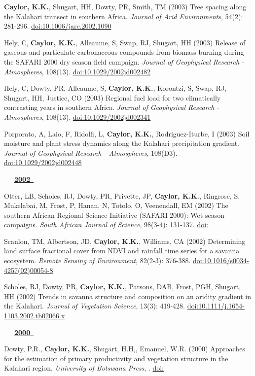 \begin{etaremune}
\item \textbf{ Caylor, K.K.}, Shugart, HH, Dowty, PR, Smith, TM (2003) Tree spacing along the Kalahari transect in southern Africa. \emph{Journal of Arid Environments}, 54(2): 281-296. \href{https://doi.org/10.1006/jare.2002.1090}{doi:10.1006/jare.2002.1090}
\item Hely, C, \textbf{ Caylor, K.K.}, Alleaume, S, Swap, RJ, Shugart, HH (2003) Release of gaseous and particulate carbonaceous compounds from biomass burning during the SAFARI 2000 dry season field campaign. \emph{Journal of Geophysical Research - Atmospheres}, 108(13). \href{https://doi.org/10.1029/2002jd002482}{doi:10.1029/2002jd002482}
\item Hely, C, Dowty, PR, Alleaume, S, \textbf{ Caylor, K.K.}, Korontzi, S, Swap, RJ, Shugart, HH, Justice, CO (2003) Regional fuel load for two climatically contrasting years in southern Africa. \emph{Journal of Geophysical Research - Atmospheres}, 108(13). \href{https://doi.org/10.1029/2002jd002341}{doi:10.1029/2002jd002341}
\item Porporato, A, Laio, F, Ridolfi, L, \textbf{ Caylor, K.K.}, Rodriguez-Iturbe, I (2003) Soil moisture and plant stress dynamics along the Kalahari precipitation gradient. \emph{Journal of Geophysical Research - Atmospheres}, 108(D3). \href{https://doi.org/10.1029/2002jd002448}{doi:10.1029/2002jd002448}

\vspace{0.1in}
\mbox{\ \ \ \underline{\textbf{2002 }}}
\vspace{0.1in}

\item Otter, LB, Scholes, RJ, Dowty, PR, Privette, JP, \textbf{ Caylor, K.K.}, Ringrose, S, Mukelabai, M, Frost, P, Hanan, N, Totolo, O, Veenendall, EM (2002) The southern African Regional Science Initiative (SAFARI 2000): Wet season campaigns. \emph{South African Journal of Science}, 98(3-4): 131-137. \href{https://doi.org/}{doi:}
\item Scanlon, TM, Albertson, JD, \textbf{ Caylor, K.K.}, Williams, CA (2002) Determining land surface fractional cover from NDVI and rainfall time series for a savanna ecosystem. \emph{Remote Sensing of Environment}, 82(2-3): 376-388. \href{https://doi.org/10.1016/s0034-4257(02)00054-8}{doi:10.1016/s0034-4257(02)00054-8}
\item Scholes, RJ, Dowty, PR, \textbf{ Caylor, K.K.}, Parsons, DAB, Frost, PGH, Shugart, HH (2002) Trends in savanna structure and composition on an aridity gradient in the Kalahari. \emph{Journal of Vegetation Science}, 13(3): 419-428. \href{https://doi.org/10.1111/j.1654-1103.2002.tb02066.x}{doi:10.1111/j.1654-1103.2002.tb02066.x}

\vspace{0.1in}
\mbox{\ \ \ \underline{\textbf{2000 }}}
\vspace{0.1in}

\item Dowty, P.R., \textbf{ Caylor, K.K.}, Shugart, H.H,, Emanuel, W.R. (2000) Approaches for the estimation of primary productivity and vegetation structure in the Kalahari region. \emph{University of Botswana Press}, . \href{https://doi.org/}{doi:}

\end{etaremune}
